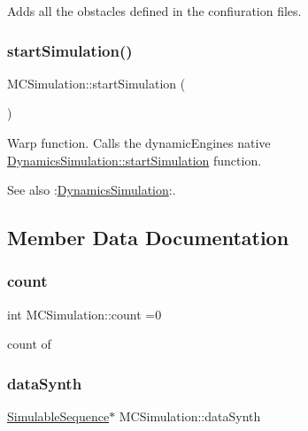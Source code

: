Adds all the obstacles defined in the confiuration files. \mbox{\label{class_m_c_simulation_aa305f18bd48dd26f916cc9c006a8dec8}} 
\subsubsection{\texorpdfstring{start\+Simulation()}{startSimulation()}}
{\footnotesize\ttfamily M\+C\+Simulation\+::start\+Simulation (\begin{DoxyParamCaption}{ }\end{DoxyParamCaption})}



Warp function. Calls the dynamic\+Engine\textquotesingle{}s native \hyperlink{class_dynamics_simulation_a820ee541ac42b1f9d08f5aef571eccc7}{Dynamics\+Simulation\+::start\+Simulation} function. 

\begin{DoxySeeAlso}{See also}
\+:\hyperlink{class_dynamics_simulation}{Dynamics\+Simulation}\+:. 
\end{DoxySeeAlso}


\subsection{Member Data Documentation}
\mbox{\label{class_m_c_simulation_aa3853b6cec83b055593cbf58def0c164}} 
\subsubsection{\texorpdfstring{count}{count}}
{\footnotesize\ttfamily int M\+C\+Simulation\+::count =0\hspace{0.3cm}{\ttfamily [static]}}

count of \mbox{\label{class_m_c_simulation_a7e2496127af6436d64bca7f52bc40c82}} 
\subsubsection{\texorpdfstring{data\+Synth}{dataSynth}}
{\footnotesize\ttfamily \hyperlink{class_simulable_sequence}{Simulable\+Sequence}$\ast$ M\+C\+Simulation\+::data\+Synth}

